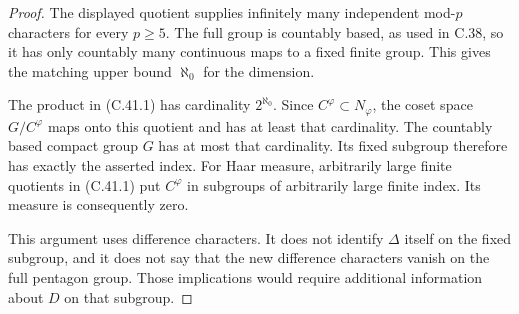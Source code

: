 \begin{proof}
The displayed quotient supplies infinitely many
independent mod-$p$ characters for every $p\geq5$.
The full group is countably based, as used in
C.38, so it has only countably many continuous
maps to a fixed finite group. This gives the
matching upper bound $\aleph_0$ for the dimension.

The product in (C.41.1) has cardinality
$2^{\aleph_0}$. Since $C^\varphi\subset N_\varphi$,
the coset space $G/C^\varphi$ maps onto this
quotient and has at least that cardinality.
The countably based compact group $G$ has at
most that cardinality. Its fixed subgroup
therefore has exactly the asserted index.
For Haar measure, arbitrarily large finite
quotients in (C.41.1) put $C^\varphi$ in
subgroups of arbitrarily large finite index.
Its measure is consequently zero.

This argument uses difference characters. It
does not identify $\Delta$ itself on the fixed
subgroup, and it does not say that the new
difference characters vanish on the full
pentagon group. Those implications would
require additional information about $D$ on
that subgroup.
\end{proof}
